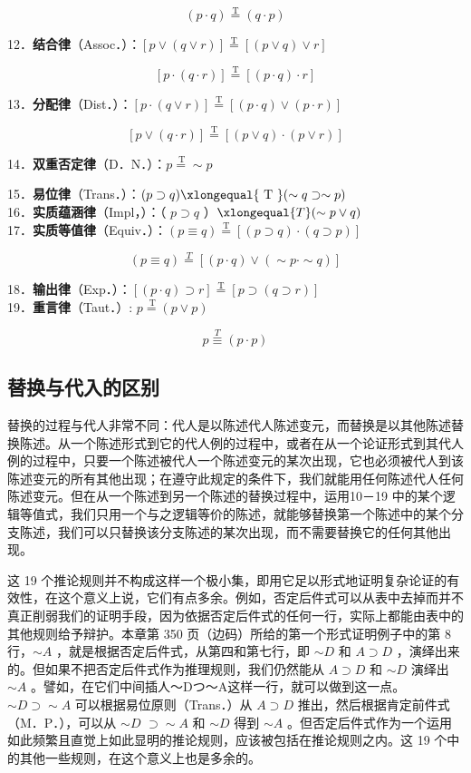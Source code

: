 $$
(p \cdot q) \stackrel{\mathrm{T}}{=}(q \cdot p)
$$

12．\textbf{结合律}（Assoc．）：$[p \vee(q \vee r)] \stackrel{\mathrm{T}}{=}[(p \vee q) \vee r]$

$$
[p \cdot(q \cdot r)] \stackrel{\mathrm{T}}{=}[(p \cdot q) \cdot r]
$$

13．\textbf{分配律}（Dist．）：$[p \cdot(q \vee r)] \stackrel{\mathrm{T}}{=}[(p \cdot q) \vee(p \cdot r)]$

$$
[p \vee(q \cdot r)] \stackrel{\mathrm{T}}{=}[(p \vee q) \cdot(p \vee r)]
$$

14．\textbf{双重否定律}（D．N．）：$p \stackrel{\mathrm{~T}}{=} \sim p$

15．\textbf{易位律}（Trans．）：$(p \supset q) \xlongequal{\text { T }}(\sim q \supset \sim p)$\\
16．\textbf{实质蕴涵律}（Impl，）：（ $p \supset q$ ）$\xlongequal{T}(\sim p \vee q)$\\
17．\textbf{实质等值律}（Equiv．）：$(p \equiv q) \stackrel{\mathrm{T}}{=}[(p \supset q) \cdot(q \supset p)]$

$$
(p \equiv q) \stackrel{T}{=}[(p \cdot q) \vee(\sim p \cdot \sim q)]
$$

18．\textbf{输出律}（Exp．）：$[(p \cdot q) \supset r] \stackrel{\mathrm{T}}{=}[p \supset(q \supset r)]$\\
19．\textbf{重言律}（Taut．）\cite{wittgenstein1922}: $p \stackrel{\mathrm{~T}}{=}(p \vee p)$

$$
p \stackrel{T}{\equiv}(p \cdot p)
$$

\subsection{替换与代入的区别}

替换的过程与代人非常不同：代人是以陈述代人陈述变元，而替换是以其他陈述替换陈述。从一个陈述形式到它的代人例的过程中，或者在从一个论证形式到其代人例的过程中，只要一个陈述被代人一个陈述变元的某次出现，它也必须被代人到该陈述变元的所有其他出现；在遵守此规定的条件下，我们就能用任何陈述代人任何陈述变元。但在从一个陈述到另一个陈述的替换过程中，运用10－19 中的某个逻辑等值式，我们只用一个与之逻辑等价的陈述，就能够替换第一个陈述中的某个分支陈述，我们可以只替换该分支陈述的某次出现，而不需要替换它的任何其他出现。

这 19 个推论规则并不构成这样一个极小集，即用它足以形式地证明复杂论证的有效性，在这个意义上说，它们有点多余。例如，否定后件式可以从表中去掉而并不真正削弱我们的证明手段，因为依据否定后件式的任何一行，实际上都能由表中的其他规则给予辩护。本章第 350 页（边码）所给的第一个形式证明例子中的第 8 行，$\sim A$ ，就是根据否定后件式，从第四和第七行，即 $\sim D$ 和 $A \supset D$ ，演绎出来的。但如果不把否定后件式作为推理规则，我们仍然能从 $A \supset D$ 和 $\sim D$ 演绎出 $\sim A$ 。譬如，在它们中间插人～Dつ～A这样一行，就可以做到这一点。 $\sim D \supset \sim A$ 可以根据易位原则（Trans．）从 $A \supset D$ 推出，然后根据肯定前件式（M．P．），可以从 $\sim D$ $\supset \sim A$ 和 $\sim D$ 得到 $\sim A$ 。但否定后件式作为一个运用如此频繁且直觉上如此显明的推论规则，应该被包括在推论规则之内。这 19 个中的其他一些规则，在这个意义上也是多余的。

